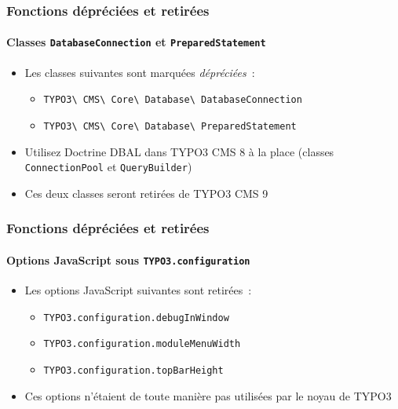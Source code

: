 \begin{frame}[fragile]
	\frametitle{Fonctions dépréciées et retirées}
	\framesubtitle{Classes \texttt{DatabaseConnection} et \texttt{PreparedStatement}}

	\begin{itemize}
		\item Les classes suivantes sont marquées \textit{dépréciées}~:
			\begin{itemize}
				\item \texttt{TYPO3\textbackslash
						CMS\textbackslash
						Core\textbackslash
						Database\textbackslash
						DatabaseConnection}
				\item \texttt{TYPO3\textbackslash
						CMS\textbackslash
						Core\textbackslash
						Database\textbackslash
						PreparedStatement}
			\end{itemize}
		\item Utilisez Doctrine DBAL dans TYPO3 CMS 8 à la place\newline
				(classes \texttt{ConnectionPool} et \texttt{QueryBuilder})
		\item Ces deux classes seront retirées de TYPO3 CMS 9
	\end{itemize}

\end{frame}


\begin{frame}[fragile]
	\frametitle{Fonctions dépréciées et retirées}
	\framesubtitle{Options JavaScript sous \texttt{TYPO3.configuration}}

	\begin{itemize}
		\item Les options JavaScript suivantes sont retirées~:

		\begin{itemize}
			\item \texttt{TYPO3.configuration.debugInWindow}
			\item \texttt{TYPO3.configuration.moduleMenuWidth}
			\item \texttt{TYPO3.configuration.topBarHeight}
		\end{itemize}

		\item Ces options n'étaient de toute manière pas utilisées par le noyau de TYPO3

	\end{itemize}

\end{frame}


